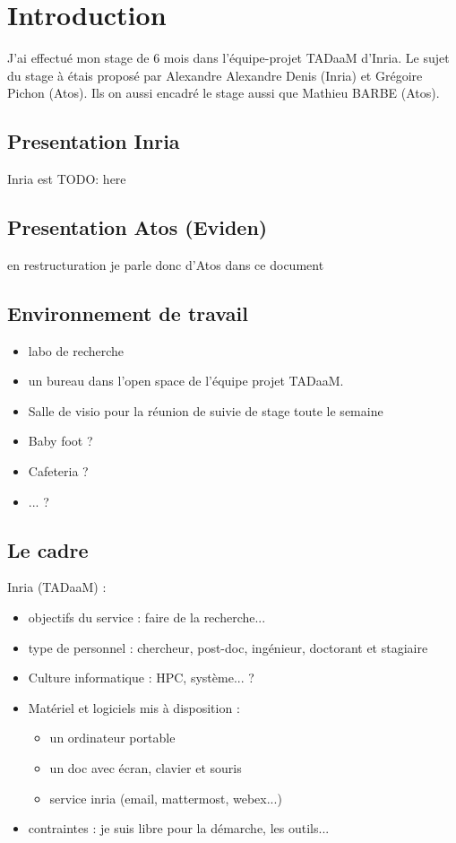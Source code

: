 \section{Introduction}

J'ai effectué mon stage de 6 mois dans l'équipe-projet TADaaM d'Inria.
Le sujet du stage à étais proposé par Alexandre Alexandre Denis (Inria) et Grégoire Pichon (Atos).
Ils on aussi encadré le stage aussi que Mathieu BARBE (Atos).

\subsection{Presentation Inria}

Inria est TODO: here


\subsection{Presentation Atos (Eviden)}

en restructuration je parle donc d'Atos dans ce document

\subsection{Environnement de travail}

\begin{itemize}
  \item labo de recherche
  \item un bureau dans l'open space de l'équipe projet TADaaM.
  \item Salle de visio pour la réunion de suivie de stage toute le semaine
  \item Baby foot ?
  \item Cafeteria ?
  \item ... ?
\end{itemize}

\subsection{Le cadre}

Inria (TADaaM) :
\begin{itemize}
  \item objectifs du service : faire de la recherche...
  \item type de personnel : chercheur, post-doc, ingénieur, doctorant et stagiaire
  \item Culture informatique : HPC, système... ?
  \item Matériel et logiciels mis à disposition :
  \begin{itemize}
    \item un ordinateur portable
    \item un doc avec écran, clavier et souris
    \item service inria (email, mattermost, webex...)
  \end{itemize}
  \item contraintes : je suis libre pour la démarche, les outils...
\end{itemize}

